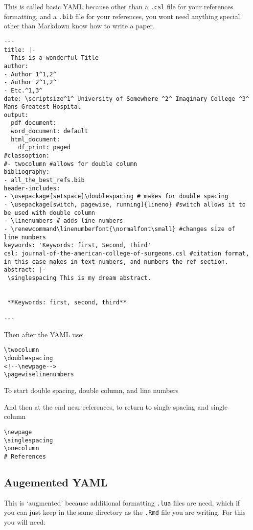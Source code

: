 \documentclass[
]{article}
\begin{document}
This is called basic YAML because other than a \texttt{.csl} file for
your references formatting, and a \texttt{.bib} file for your
references, you wont need anything special other than Markdown know how
to write a paper.

\begin{verbatim}
---
title: |-
  This is a wonderful Title
author: 
- Author 1^1,2^
- Author 2^1,2^
- Etc.^1,3^
date: \scriptsize^1^ University of Somewhere ^2^ Imaginary College ^3^ Mans Greatest Hospital
output:
  pdf_document:
  word_document: default
  html_document:
    df_print: paged
#classoption:
#- twocolumn #allows for double column
bibliography:
- all_the_best_refs.bib
header-includes: 
- \usepackage{setspace}\doublespacing # makes for double spacing
- \usepackage[switch, pagewise, running]{lineno} #switch allows it to be used with double column
- \linenumbers # adds line numbers
- \renewcommand\linenumberfont{\normalfont\small} #changes size of line numbers
keywords: 'Keywords: first, Second, Third'
csl: journal-of-the-american-college-of-surgeons.csl #citation format, in this case makes in text numbers, and numbers the ref section.
abstract: |-
 \singlespacing This is my dream abstract. 


 **Keywords: first, second, third**

---
\end{verbatim}

Then after the YAML use:

\begin{verbatim}
\twocolumn
\doublespacing
<!--\newpage-->
\pagewiselinenumbers
\end{verbatim}

To start double spacing, double column, and line numbers

And then at the end near references, to return to single spacing and
single column

\begin{verbatim}
\newpage
\singlespacing
\onecolumn
# References
\end{verbatim}

\hypertarget{augemented-yaml}{%
\subsection{Augemented YAML}\label{augemented-yaml}}

This is `augmented' because additional formatting \texttt{.lua} files
are need, which if you can just keep in the same directory as the
\texttt{.Rmd} file you are writing. For this you will need:
\end{document}
